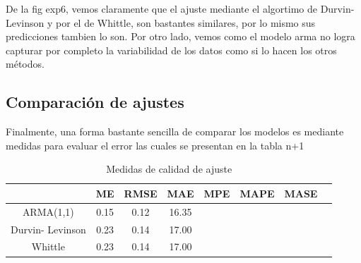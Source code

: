 \documentclass[
  letterpaper,
  DIV=11,
  numbers=noendperiod,
  twocolumn]{scrartcl}
\begin{document}
De la fig exp6, vemos claramente que el ajuste mediante el algortimo de
Durvin-Levinson y por el de Whittle, son bastantes similares, por lo
mismo sus predicciones tambien lo son. Por otro lado, vemos como el
modelo arma no logra capturar por completo la variabilidad de los datos
como si lo hacen los otros métodos.

\hypertarget{comparaciuxf3n-de-ajustes}{%
\subsection{Comparación de ajustes}\label{comparaciuxf3n-de-ajustes}}

Finalmente, una forma bastante sencilla de comparar los modelos es
mediante medidas para evaluar el error las cuales se presentan en la
tabla n+1

\begin{table}[H]
\centering
\begin{tabular}{| c | c | c | c | c | c | c | c |}
\hline
 & ME & RMSE & MAE & MPE & MAPE & MASE \\
\hline
ARMA(1,1) & 0.15 & 0.12 & 16.35\\
\hline
Durvin- \n Levinson & 0.23 & 0.14 & 17.00 \\
\hline
Whittle & 0.23 & 0.14 & 17.00 \\
\bottomrule
\end{tabular}
\caption{Medidas de calidad de ajuste}

\end{table}
\end{document}
